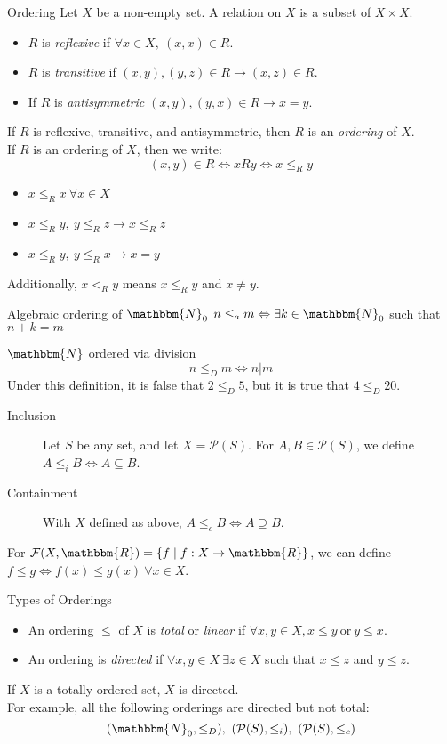 \documentclass[10pt]{extarticle}
\newcommand{\N}{\mathbbm{N}}
\newcommand{\R}{\mathbbm{R}}
\begin{document}
  \begin{problem}{Ordering}
    Let $X$ be a non-empty set. A relation on $X$ is a subset of $X\times X$.
    \begin{itemize}
      \item $R$ is \textsl{reflexive} if $\forall x\in X,~(x,x)\in R$.
      \item $R$ is \textsl{transitive} if $(x,y),(y,z)\in R \rightarrow (x,z)\in R$.
      \item If $R$ is \textsl{antisymmetric} $(x,y),(y,x)\in R\rightarrow x=y$. 
    \end{itemize}
    If $R$ is reflexive, transitive, and antisymmetric, then $R$ is an \textsl{ordering} of $X$.\\

    If $R$ is an ordering of $X$, then we write:
    \[
      (x,y)\in R \Leftrightarrow xRy \Leftrightarrow x\leq_{R} y
    \] 
    \begin{itemize}
      \item $x\leq_{R}x~\forall x\in X$
      \item $x\leq_R y,~y\leq_R z \rightarrow x\leq_R z$
      \item $x\leq_R y,~y\leq_R x \rightarrow x=y$
    \end{itemize}
    Additionally, $x<_R y$ means $x\leq_R y$ and $x\neq y$.
    \begin{problem}{Algebraic ordering of $\N_0$}
      $n\leq_a m\Leftrightarrow \exists k\in \N_0$ such that $n+k = m$
    \end{problem}
    \begin{problem}{$\N$ ordered via division}
      $$n\leq_D m \Leftrightarrow n|m$$
      Under this definition, it is false that $2\leq_D 5$, but it is true that $4\leq_D 20$.
    \end{problem}
    \begin{description}
      \item[Inclusion] Let $S$ be any set, and let $X = \mathcal{P}(S)$. For $A,B\in \mathcal{P}(S)$, we define $A\leq_i B \Leftrightarrow A\subseteq B$.
      \item[Containment] With $X$ defined as above, $A\leq_c B\Leftrightarrow A\supseteq B$.
    \end{description}
    For $\mathcal{F}(X,\R) = \{f\mid f:X\rightarrow\R\}$, we can define $f\leq g\Leftrightarrow f(x)\leq g(x)~\forall x\in X$.
  \end{problem}
  \begin{problem}{Types of Orderings}
    \begin{itemize}
      \item An ordering $\leq$ of $X$ is \textsl{total} or \textit{linear} if $\forall x,y\in X, x\leq y~\text{or}~y\leq x$. 
      \item An ordering is \textsl{directed} if $\forall x,y\in X~\exists z\in X$ such that $x\leq z$ and $y\leq z$.
    \end{itemize}
    If $X$ is a totally ordered set, $X$ is directed.\\

    For example, all the following orderings are directed but not total:
    \[
      (\N_0,\leq_D),~(\mathcal{P}(S),\leq_i),~(\mathcal{P}(S),\leq_c)
    \] 
  \end{problem}
\end{document}
